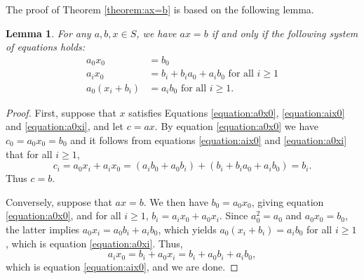 \documentclass[a4paper, 11pt]{article}
\theoremstyle{plain}
\newtheorem{lemma}      [theorem]{Lemma}
\theoremstyle{definition}
\begin{document}
The proof of Theorem \ref{theorem:ax=b} is based on the following lemma.

\begin{lemma} \label{lemma:ax=b}
For any $a,b,x \in S$, we have $ax = b$ if and only if the following system of equations holds:
\begin{align}
    \label{equation:a0x0}
    a_0 x_0 &= b_0 \\
    \label{equation:aix0}
    a_i x_0 &= b_i + b_i a_0 + a_i b_0 \text{ for all } i \ge 1\\
    \label{equation:a0xi}
    a_0 (x_i + b_i) &= a_i b_0 \text{ for all } i \ge 1.
\end{align}
\end{lemma}

\begin{proof}
First, suppose that $x$ satisfies Equations \eqref{equation:a0x0}, \eqref{equation:aix0} and \eqref{equation:a0xi}, and let $c = ax$. By equation \eqref{equation:a0x0} we have $c_0 = a_0 x_0 = b_0$ and it follows from equations \eqref{equation:aix0} and \eqref{equation:a0xi} that for all $i \ge 1$,
\[
    c_i = a_0 x_i + a_i x_0 = (a_i b_0 + a_0 b_i) + (b_i + b_i a_0 + a_i b_0) = b_i.
\]
Thus $c = b$.

Conversely, suppose that $ax = b$. We then have $b_0 = a_0 x_0$, giving equation \eqref{equation:a0x0}, and for all $i \ge 1$, $b_i = a_i x_0 + a_0 x_i$. Since $a_0^2 = a_0$ and $a_0 x_0 = b_0$, the latter implies $a_0 x_i = a_0 b_i + a_i b_0$, which yields $a_0 (x_i + b_i) = a_i b_0$ for all $i \geq 1$, which is equation \eqref{equation:a0xi}. Thus,
\[
    a_i x_0 = b_i + a_0 x_i = b_i + a_0 b_i + a_i b_0,
\]
which is equation \eqref{equation:aix0}, and we are done.
\end{proof}
\end{document}
